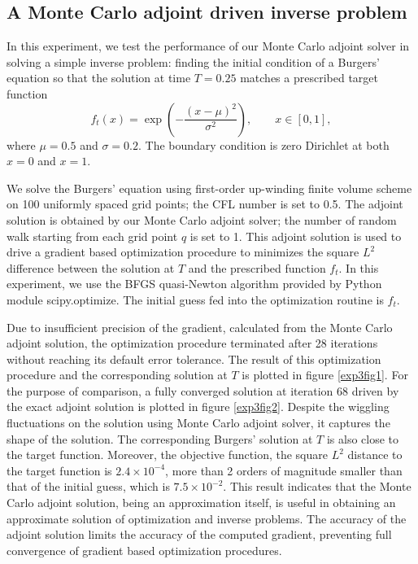 \documentclass{elsart}
\theoremstyle{remark}
\theoremstyle{definition}
\theoremstyle{proof}
\begin{document}
 
    \subsection{A Monte Carlo adjoint driven inverse problem}
        In this experiment, we test the performance of our Monte Carlo adjoint
        solver in solving a simple inverse problem: finding the initial
        condition of a Burgers' equation so that the solution at time $T=0.25$
        matches a prescribed target function
        \[ f_t(x) = \exp\left(-\frac{(x-\mu)^2}{\sigma^2}\right),
           \qquad x \in [0, 1],
        \]
        where $\mu = 0.5$ and $\sigma = 0.2$.  The boundary condition is
        zero Dirichlet at both $x=0$ and $x=1$.

        We solve the Burgers' equation using first-order up-winding finite
        volume scheme on 100 uniformly spaced grid points; the CFL number
        is set to 0.5.  The adjoint solution is obtained by our Monte Carlo
        adjoint solver; the number of random walk starting from each grid
        point $q$ is set to 1.  This adjoint solution is used to drive a
        gradient based optimization procedure to minimizes the square $L^2$
        difference between the solution at $T$ and the prescribed function
        $f_t$.  In this experiment, we use the BFGS quasi-Newton algorithm
        provided by Python module scipy.optimize.  The initial guess fed
        into the optimization routine is $f_t$.
        
        Due to insufficient precision of the gradient, calculated from the
        Monte Carlo adjoint solution, the optimization procedure terminated
        after 28 iterations without reaching its default error tolerance.
        The result of this optimization procedure and the corresponding
        solution at $T$ is plotted in figure \ref{exp3fig1}.  For the
        purpose of comparison, a fully converged solution at iteration 68
        driven by the exact adjoint solution is plotted in figure
        \ref{exp3fig2}.  Despite the wiggling fluctuations on the solution
        using Monte Carlo adjoint solver, it captures the shape of the
        solution.  The corresponding Burgers' solution at $T$ is also close
        to the target function.  Moreover, the objective function, the square
        $L^2$ distance to the target function is $2.4\times 10^{-4}$, more
        than 2 orders of magnitude smaller than that of the initial guess,
        which is $7.5\times 10^{-2}$.  This result indicates that the
        Monte Carlo adjoint solution, being an approximation itself, is
        useful in obtaining an approximate solution of optimization and
        inverse problems.  The accuracy of the adjoint solution limits the
        accuracy of the computed gradient, preventing full convergence
        of gradient based optimization procedures.
\end{document}
